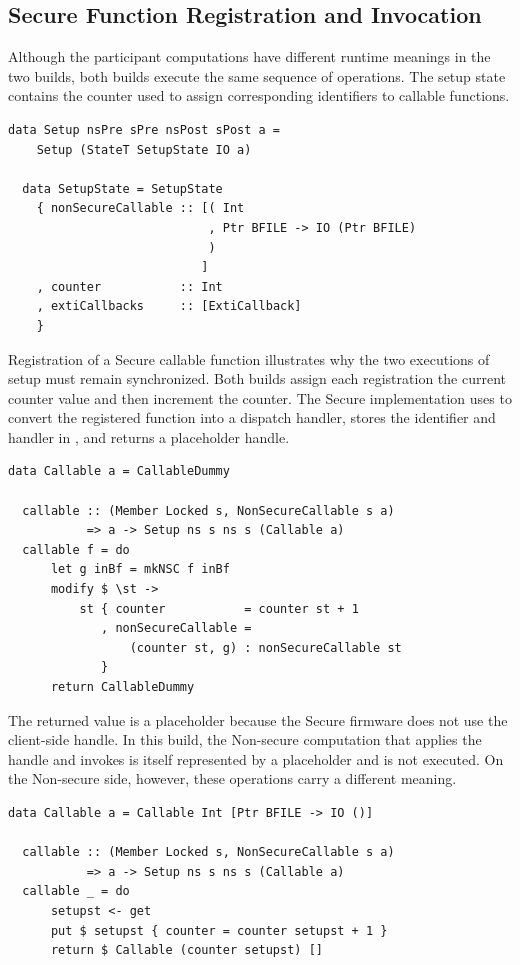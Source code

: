 \documentclass[sigconf]{acmart}
\begin{document}
\subsection{Secure Function Registration and Invocation}

Although the participant computations have different runtime meanings in the two builds, both builds execute the same sequence of  operations.
The setup state contains the counter used to assign corresponding identifiers to callable functions.

\begin{lstlisting}[style=haskell]
  data Setup nsPre sPre nsPost sPost a =
    Setup (StateT SetupState IO a)
  
  data SetupState = SetupState
    { nonSecureCallable :: [( Int
                            , Ptr BFILE -> IO (Ptr BFILE)
                            )
                           ]
    , counter           :: Int
    , extiCallbacks     :: [ExtiCallback]
    }
\end{lstlisting}

Registration of a Secure callable function illustrates why the two executions of setup must remain synchronized.
Both builds assign each registration the current counter value and then increment the counter.
The Secure implementation uses  to convert the registered function into a dispatch handler, stores the identifier and handler in , and returns a placeholder handle.

\begin{lstlisting}[style=haskell]
  data Callable a = CallableDummy

  callable :: (Member Locked s, NonSecureCallable s a)
           => a -> Setup ns s ns s (Callable a)
  callable f = do
      let g inBf = mkNSC f inBf
      modify $ \st ->
          st { counter           = counter st + 1
             , nonSecureCallable =
                 (counter st, g) : nonSecureCallable st
             }
      return CallableDummy
\end{lstlisting}

The returned  value is a placeholder because the Secure firmware does not use the client-side handle.
In this build, the Non-secure computation that applies the handle and invokes  is itself represented by a placeholder and is not executed.
On the Non-secure side, however, these operations carry a different meaning.

\begin{lstlisting}[style=haskell]
  data Callable a = Callable Int [Ptr BFILE -> IO ()]

  callable :: (Member Locked s, NonSecureCallable s a)
           => a -> Setup ns s ns s (Callable a)
  callable _ = do
      setupst <- get
      put $ setupst { counter = counter setupst + 1 }
      return $ Callable (counter setupst) []
\end{lstlisting}
\end{document}
